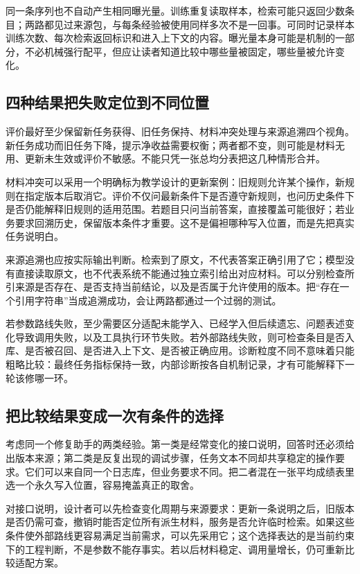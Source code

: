 同一条序列也不自动产生相同曝光量。训练重复读取样本，检索可能只返回少数条目；两路都见过来源包，与每条经验被使用同样多次不是一回事。可同时记录样本训练次数、每次检索返回标识和进入上下文的内容。曝光量本身可能是机制的一部分，不必机械强行配平，但应让读者知道比较中哪些量被固定，哪些量被允许变化。

\subsection{四种结果把失败定位到不同位置}

评价最好至少保留新任务获得、旧任务保持、材料冲突处理与来源追溯四个视角。新任务成功而旧任务下降，提示净收益需要权衡；两者都不变，则可能是材料无用、更新未生效或评价不敏感。不能只凭一张总均分表把这几种情形合并。

材料冲突可以采用一个明确标为教学设计的更新案例：旧规则允许某个操作，新规则在指定版本后取消它。评价不仅问最新条件下是否遵守新规则，也问历史条件下是否仍能解释旧规则的适用范围。若题目只问当前答案，直接覆盖可能很好；若业务要求回溯历史，保留版本条件才重要。这不是偏袒哪种写入位置，而是先把真实任务说明白。

来源追溯也应按实际输出判断。检索到了原文，不代表答案正确引用了它；模型没有直接读取原文，也不代表系统不能通过独立索引给出对应材料。可以分别检查所引来源是否存在、是否支持当前结论，以及是否属于允许使用的版本。把“存在一个引用字符串”当成追溯成功，会让两路都通过一个过弱的测试。

若参数路线失败，至少需要区分适配未能学入、已经学入但后续遗忘、问题表述变化导致调用失败，以及工具执行环节失败。若外部路线失败，则可检查条目是否入库、是否被召回、是否进入上下文、是否被正确应用。诊断粒度不同不意味着只能粗略比较：最终任务指标保持一致，内部诊断按各自机制记录，才有可能解释下一轮该修哪一环。

\subsection{把比较结果变成一次有条件的选择}

考虑同一个修复助手的两类经验。第一类是经常变化的接口说明，回答时还必须给出版本来源；第二类是反复出现的调试步骤，任务文本不同却共享稳定的操作要求。它们可以来自同一个日志库，但业务要求不同。把二者混在一张平均成绩表里选一个永久写入位置，容易掩盖真正的取舍。

对接口说明，设计者可以先检查变化周期与来源要求：更新一条说明之后，旧版本是否仍需可查，撤销时能否定位所有派生材料，服务是否允许临时检索。如果这些条件使外部路线更容易满足当前需求，可以先采用它；这个选择表达的是当前约束下的工程判断，不是参数不能存事实。若以后材料稳定、调用量增长，仍可重新比较适配方案。

